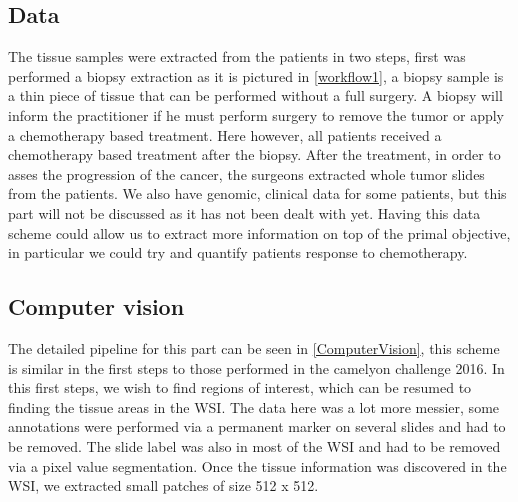 \documentclass[a4paper,10pt]{article}
\begin{document}
\subsection{Data}

The tissue samples were extracted from the patients in two steps, first was performed a biopsy extraction as it is pictured in \ref{workflow1}, a biopsy sample is a thin piece of tissue that can be performed without a full surgery. A biopsy will inform the practitioner if he must perform surgery to remove the tumor or apply a chemotherapy based treatment. Here however, all patients received a chemotherapy based treatment after the biopsy. After the treatment, in order to asses the progression of the cancer, the surgeons extracted whole tumor slides from the patients. We also have genomic, clinical data for some patients, but this part will not be discussed as it has not been dealt with yet. Having this data scheme could allow us to extract more information on top of the primal objective, in particular we could try and quantify patients response to chemotherapy.

\subsection{Computer vision}

The detailed pipeline for this part can be seen in \ref{ComputerVision}, this scheme is similar in the first steps to those performed in the camelyon challenge 2016. In this first steps, we wish to find regions of interest, which can be resumed to finding the tissue areas in the WSI. The data here was a lot more messier, some annotations were performed via a permanent marker on several slides and had to be removed. The slide label was also in most of the WSI and had to be removed via a pixel value segmentation. Once the tissue information was discovered in the WSI, we extracted small patches of size 512 x 512.
\end{document}
